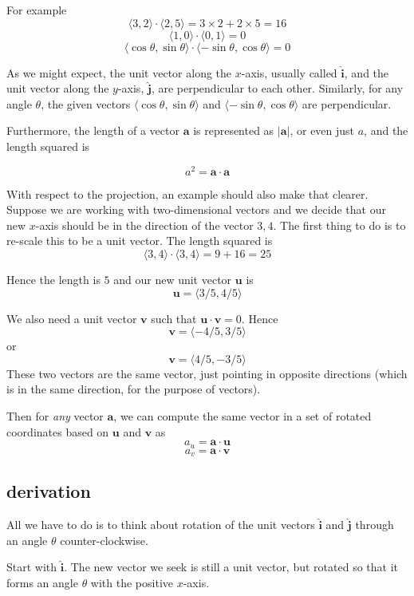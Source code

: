 \documentclass[11pt, oneside]{report}   	%
\begin{document}
For example
\[ \langle 3, 2 \rangle \cdot  \langle 2, 5 \rangle = 3 \times 2 + 2 \times 5 = 16 \]
\[ \langle 1, 0 \rangle \cdot  \langle 0, 1 \rangle = 0 \]
\[ \langle \cos \theta, \sin \theta \rangle \cdot  \langle -\sin \theta, \cos \theta \rangle = 0 \]

As we might expect, the unit vector along the $x$-axis, usually called $\hat{\mathbf{i}}$, and the unit vector along the $y$-axis, $\hat{\mathbf{j}}$, are perpendicular to each other.  Similarly, for any angle $\theta$, the given vectors $\langle \cos \theta, \sin \theta \rangle$ and $\langle -\sin \theta, \cos \theta \rangle$ are perpendicular.

Furthermore, the length of a vector $\mathbf{a}$ is represented as $|\mathbf{a}|$, or even just $a$, and the length squared is

\[ a^2 = \mathbf{a} \cdot \mathbf{a} \]

With respect to the projection, an example should also make that clearer.  Suppose we are working with two-dimensional vectors and we decide that our new $x$-axis should be in the direction of the vector $3,4$.  The first thing to do is to re-scale this to be a unit vector.  The length squared is
\[ \langle 3, 4 \rangle \cdot  \langle 3, 4 \rangle = 9 + 16 = 25 \]

Hence the length is $5$ and our new unit vector $\mathbf{u}$ is 
\[ \mathbf{u} = \langle 3/5, 4/5 \rangle \]

We also need a unit vector $\mathbf{v}$ such that $\mathbf{u} \cdot \mathbf{v} = 0$.  Hence
\[ \mathbf{v} = \langle -4/5, 3/5 \rangle \]
or 
\[ \mathbf{v} = \langle 4/5, -3/5 \rangle \]
These two vectors are the same vector, just pointing in opposite directions (which is in the same direction, for the purpose of vectors).

Then for \emph{any} vector $\mathbf{a}$, we can compute the same vector in a set of rotated coordinates based on $\mathbf{u}$ and $\mathbf{v}$ as
\[ a_u = \mathbf{a} \cdot \mathbf{u} \]
\[ a_v = \mathbf{a} \cdot \mathbf{v} \]

\subsection*{derivation}

All we have to do is to think about rotation of the unit vectors $\hat{\mathbf{i}}$ and $\hat{\mathbf{j}}$ through an angle $\theta$ counter-clockwise.  

Start with $\hat{\mathbf{i}}$.  The new vector we seek is still a unit vector, but rotated so that it forms an angle $\theta$ with the positive $x$-axis.
\end{document}
